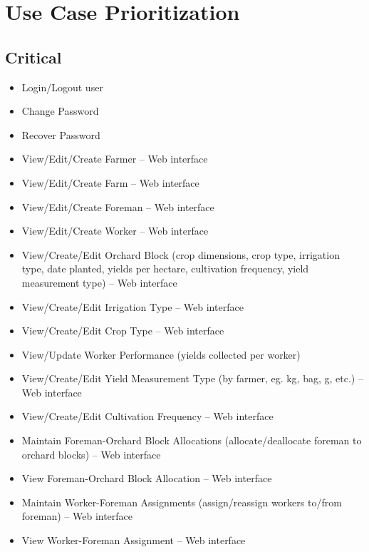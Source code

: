 \documentclass[11pt,fleqn]{book} %
\begin{document}


\chapter{Use Case Prioritization}
	\section{Critical}
	\begin{itemize}
		\item Login/Logout user
		\item Change Password
		\item Recover Password
		\item View/Edit/Create Farmer – Web interface
		\item View/Edit/Create Farm – Web interface
		\item View/Edit/Create Foreman – Web interface
		\item View/Edit/Create Worker – Web interface
		\item View/Create/Edit Orchard Block (crop dimensions, crop type, irrigation type, date planted, yields per hectare, cultivation frequency, yield measurement type) – Web interface
		\item View/Create/Edit Irrigation Type – Web interface
		\item View/Create/Edit Crop Type – Web interface
		\item View/Update Worker Performance (yields collected per worker)
		\item View/Create/Edit Yield Measurement Type (by farmer, eg. kg, bag, g, etc.) – Web interface
		\item View/Create/Edit Cultivation Frequency – Web interface
		\item Maintain Foreman-Orchard Block Allocations (allocate/deallocate foreman to orchard blocks) – Web interface
		\item View Foreman-Orchard Block Allocation – Web interface
		\item Maintain Worker-Foreman Assignments (assign/reassign workers to/from foreman) – Web interface
		\item View Worker-Foreman Assignment – Web interface
		
	\end{itemize}
\end{document}
